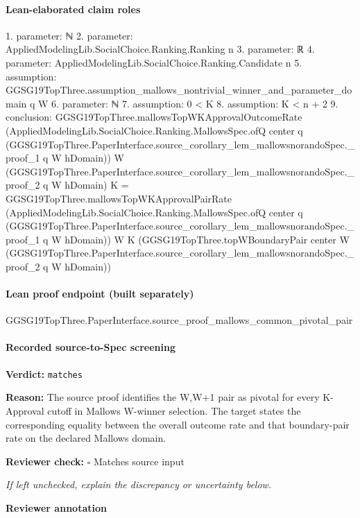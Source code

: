 \documentclass[10pt]{article}
\newcommand{\reviewerbox}{%
  \par\noindent\fbox{\parbox{0.96\linewidth}{\rule{0pt}{0.38in}}}\par
}
\newcommand{\reviewmatch}[1]{%
  \par\noindent\textbf{Reviewer check:} $\square$\; #1\par
  \noindent\emph{If left unchecked, explain the discrepancy or uncertainty below.}\par
}
\begin{document}
\paragraph{Lean-elaborated claim roles}\begin{ReviewVerbatim}
1. parameter: ℕ
2. parameter: AppliedModelingLib.SocialChoice.Ranking.Ranking n
3. parameter: ℝ
4. parameter: AppliedModelingLib.SocialChoice.Ranking.Candidate n
5. assumption: GGSG19TopThree.assumption_mallows_nontrivial_winner_and_parameter_domain q W
6. parameter: ℕ
7. assumption: 0 < K
8. assumption: K < n + 2
9. conclusion: GGSG19TopThree.mallowsTopWKApprovalOutcomeRate
    (AppliedModelingLib.SocialChoice.Ranking.MallowsSpec.ofQ center q
      (GGSG19TopThree.PaperInterface.source_corollary_lem_mallowsnorandoSpec._proof_1 q W hDomain))
    W (GGSG19TopThree.PaperInterface.source_corollary_lem_mallowsnorandoSpec._proof_2 q W hDomain) K =
  GGSG19TopThree.mallowsTopWKApprovalPairRate
    (AppliedModelingLib.SocialChoice.Ranking.MallowsSpec.ofQ center q
      (GGSG19TopThree.PaperInterface.source_corollary_lem_mallowsnorandoSpec._proof_1 q W hDomain))
    W K
    (GGSG19TopThree.topWBoundaryPair center W
      (GGSG19TopThree.PaperInterface.source_corollary_lem_mallowsnorandoSpec._proof_2 q W hDomain))
\end{ReviewVerbatim}

\paragraph{Lean proof endpoint (built separately)}\begin{ReviewVerbatim}
GGSG19TopThree.PaperInterface.source_proof_mallows_common_pivotal_pair
\end{ReviewVerbatim}

\paragraph{Recorded source-to-Spec screening}
\textbf{Verdict:} \texttt{matches}
\\
{\raggedright
\textbf{Reason:} The source proof identifies the W,W+1 pair as pivotal for every K-\allowbreak{}Approval cutoff in Mallows W-\allowbreak{}winner selection.\allowbreak{} The target states the corresponding equality between the overall outcome rate and that boundary-\allowbreak{}pair rate on the declared Mallows domain.\allowbreak{}
\par}
\reviewmatch{Matches source input}
\noindent\textbf{Reviewer annotation}\par
\reviewerbox
\clearpage
\hypertarget{source-claim-909010c9cf279ba2}{}
\end{document}
